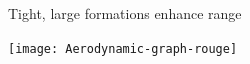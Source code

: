 \documentclass[]{beamer}
\begin{document}

\usebackgroundtemplate{} 
\begin{frame}{Tight, large formations enhance range\cite{Hummel1982}}
\begin{center}
\texttt{[image: Aerodynamic-graph-rouge]}
\end{center}
\end{frame}
\end{document}
